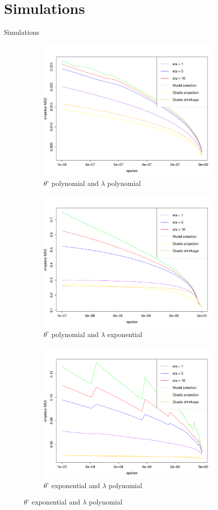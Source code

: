 \documentclass[10pt]{beamer}
\begin{document}
\section{Simulations}
\begin{frame}{Simulations}
\begin{figure}
\centering
\begin{subfigure}{.5\textwidth}
  \centering
  \includegraphics[width=.5\linewidth]{EQM1.pdf}
  \caption{$\theta^{\circ}$ polynomial and $\lambda$ polynomial}
  \label{fig3:sub1}
\end{subfigure}%
\begin{subfigure}{.5\textwidth}
  \centering
  \includegraphics[width=.5\linewidth]{EQM2.pdf}
  \caption{$\theta^{\circ}$ polynomial and $\lambda$ exponential}
  \label{fig3:sub2}
\end{subfigure}
\begin{subfigure}{.5\textwidth}
  \centering
  \includegraphics[width=.5\linewidth]{EQM3}
  \caption{$\theta^{\circ}$ exponential and $\lambda$ polynomial}

\end{subfigure}
\end{figure}
\end{frame}
\end{document}
